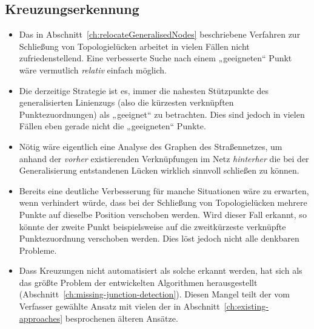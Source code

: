 \documentclass[../main/thesis.tex]{subfiles}
\begin{document}



\subsection{Kreuzungserkennung}

\begin{itemize}

\item
Das in Abschnitt~\ref{ch:relocateGeneralisedNodes} beschriebene Verfahren zur Schließung von Topologielücken arbeitet in vielen Fällen nicht zufriedenstellend. Eine verbesserte Suche nach einem „geeigneten“ Punkt wäre vermutlich \emph{relativ} einfach möglich.

\item
Die derzeitige Strategie ist es, immer die nahesten Stützpunkte des generalisierten Linienzugs (also die kürzesten verknüpften Punktezuordnungen) als „geeignet“ zu betrachten.
Dies sind jedoch in vielen Fällen eben gerade nicht die „geeigneten“ Punkte.

\item
Nötig wäre eigentlich eine Analyse des Graphen des Straßennetzes, um anhand der \emph{vorher} existierenden Verknüpfungen im Netz \emph{hinterher} die bei der Generalisierung entstandenen Lücken wirklich sinnvoll schließen zu können.

\item
Bereits eine deutliche Verbesserung für manche Situationen wäre zu erwarten, wenn verhindert würde, dass bei der Schließung von Topologielücken mehrere Punkte auf dieselbe Position verschoben werden.
Wird dieser Fall erkannt, so könnte der zweite Punkt beispielsweise auf die zweitkürzeste verknüpfte Punktezuordnung verschoben werden.
Dies löst jedoch nicht alle denkbaren Probleme.

\item
Dass Kreuzungen nicht automatisiert als solche erkannt werden, hat sich als das größte Problem der entwickelten Algorithmen herausgestellt (Abschnitt~\ref{ch:missing-junction-detection}).
Diesen Mangel teilt der vom Verfasser gewählte Ansatz mit vielen der in Abschnitt~\ref{ch:existing-approaches} besprochenen älteren Ansätze.


\end{itemize}
\end{document}
